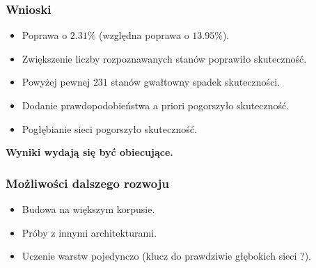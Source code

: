 \documentclass[mathserif, serif]{beamer}
\begin{document}
	\begin{frame}
		\frametitle{Wnioski}
		
		\begin{itemize}
			\item Poprawa o $2.31\%$ (względna poprawa o $13.95\%$).
			\item Zwiększenie liczby rozpoznawanych stanów poprawiło skuteczność.
			\item Powyżej pewnej $231$ stanów gwałtowny spadek skuteczności.
			\item Dodanie prawdopodobieństwa a priori pogorszyło skuteczność.
			\item Pogłębianie sieci pogorszyło skuteczność.
		\end{itemize}
	
	\begin{exampleblock}{}
		\textbf{Wyniki wydają się być obiecujące.}
	\end{exampleblock}
	
	\end{frame}

	\begin{frame}
		\frametitle{Możliwości dalszego rozwoju}
		
		\begin{itemize}
			\item Budowa na większym korpusie.
			\item Próby z innymi architekturami.
			\item Uczenie warstw pojedynczo (klucz do prawdziwie głębokich sieci ?).
		\end{itemize}
	\end{frame}
\end{document}
